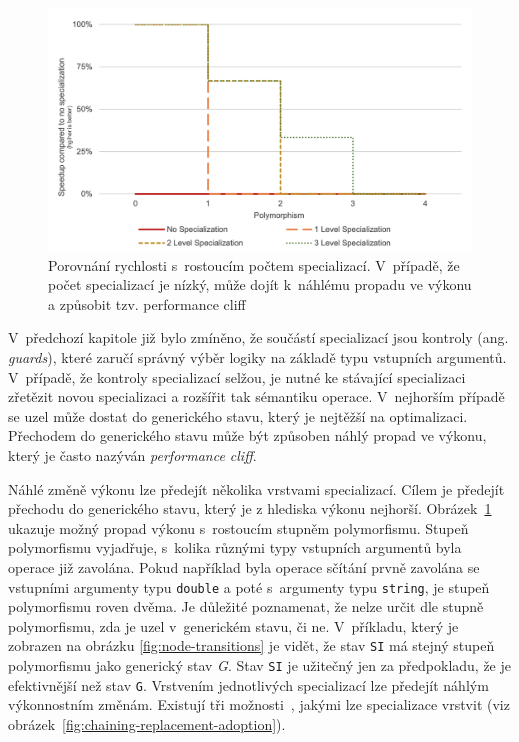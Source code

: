 \documentclass[
  master,
  biblatex,
  figures=true,
  theorems,
  sourcecodes,
  glossaries,
  index
]{kidiplom}
\begin{document}
\begin{figure} [h]
    \centering
    \includegraphics[width= 1\textwidth]{images/perf-cliff.png}
    \caption{Porovnání rychlosti s~rostoucím počtem specializací. V~případě, že počet specializací je nízký, může dojít k~náhlému propadu ve výkonu a způsobit tzv. performance cliff \cite{truffle-dsl-thesis}}
    \label{fig:performance-cliff}
\end{figure}

V~předchozí kapitole již bylo zmíněno, že součástí specializací jsou kontroly (ang. \textit{guards}), které zaručí správný výběr logiky na základě typu vstupních argumentů. V~případě, že kontroly specializací selžou, je nutné ke stávající specializaci zřetězit novou specializaci a rozšířit tak sémantiku operace. V~nejhorším případě se uzel může dostat do generického stavu, který je nejtěžší na optimalizaci. Přechodem do generického stavu může být způsoben náhlý propad ve výkonu, který je často nazýván \textit{performance cliff}.




Náhlé změně výkonu lze předejít několika vrstvami specializací. Cílem je předejít přechodu do generického stavu, který je z hlediska výkonu nejhorší. Obrázek~\ref{fig:performance-cliff} ukazuje možný propad výkonu s~rostoucím stupněm polymorfismu. Stupeň polymorfismu vyjadřuje, s~kolika různými typy vstupních argumentů byla operace již zavolána. Pokud například byla operace sčítání prvně zavolána se vstupními argumenty typu \texttt{double} a poté s~argumenty typu \texttt{string}, je stupeň polymorfismu roven dvěma. Je důležité poznamenat, že nelze určit dle stupně polymorfismu, zda je uzel v~generickém stavu, či ne. V~příkladu, který je zobrazen na obrázku \ref{fig:node-transitions} je vidět, že stav \texttt{SI} má stejný stupeň polymorfismu jako generický stav \textit{G}. Stav \texttt{SI} je užitečný jen za předpokladu, že je efektivnější než stav \texttt{G}. Vrstvením jednotlivých specializací lze předejít náhlým výkonnostním změnám. Existují tři možnosti~\cite{truffle-dsl-thesis}, jakými lze specializace vrstvit (viz obrázek~\ref{fig:chaining-replacement-adoption}).
\end{document}
